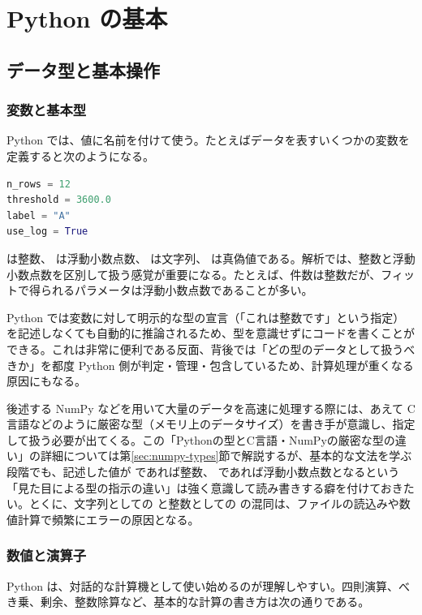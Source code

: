 \chapter{Python の基本}

\section{データ型と基本操作}

\subsection{変数と基本型}

Python では、値に名前を付けて使う。たとえばデータを表すいくつかの変数を定義すると次のようになる。

\begin{lstlisting}[language=Python]
n_rows = 12
threshold = 3600.0
label = "A"
use_log = True
\end{lstlisting}

 は整数、 は浮動小数点数、 は文字列、 は真偽値である。解析では、整数と浮動小数点数を区別して扱う感覚が重要になる。たとえば、件数は整数だが、フィットで得られるパラメータは浮動小数点数であることが多い。

Python では変数に対して明示的な型の宣言（「これは整数です」という指定）を記述しなくても自動的に推論されるため、型を意識せずにコードを書くことができる。これは非常に便利である反面、背後では「どの型のデータとして扱うべきか」を都度 Python 側が判定・管理・包含しているため、計算処理が重くなる原因にもなる。

後述する NumPy などを用いて大量のデータを高速に処理する際には、あえて C 言語などのように厳密な型（メモリ上のデータサイズ）を書き手が意識し、指定して扱う必要が出てくる。この「Pythonの型とC言語・NumPyの厳密な型の違い」の詳細については第\ref{sec:numpy-types}節で解説するが、基本的な文法を学ぶ段階でも、記述した値が  であれば整数、 であれば浮動小数点数となるという「見た目による型の指示の違い」は強く意識して読み書きする癖を付けておきたい。とくに、文字列としての  と整数としての  の混同は、ファイルの読込みや数値計算で頻繁にエラーの原因となる。

\subsection{数値と演算子}

Python は、対話的な計算機として使い始めるのが理解しやすい。四則演算、べき乗、剰余、整数除算など、基本的な計算の書き方は次の通りである。

